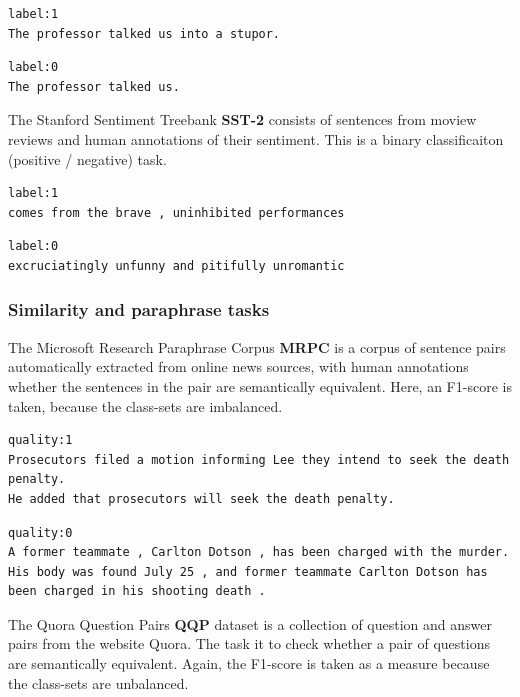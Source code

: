 \documentclass[a4paper,12pt,twoside,openright]{report}
\begin{document}
\begin{verbatim}
label:1
The professor talked us into a stupor.
\end{verbatim}

\begin{verbatim}
label:0	
The professor talked us.
\end{verbatim}


The Stanford Sentiment Treebank \textbf{SST-2} \cite{socher2013} consists of sentences from moview reviews and human annotations of their sentiment.
This is a binary classificaiton (positive / negative) task.


\begin{verbatim}
label:1
comes from the brave , uninhibited performances
\end{verbatim}

\begin{verbatim}
label:0
excruciatingly unfunny and pitifully unromantic
\end{verbatim}

\subsubsection{Similarity and paraphrase tasks}

The Microsoft Research Paraphrase Corpus \textbf{MRPC} \cite{dolan2005} is a corpus of sentence pairs automatically extracted from online news sources, with human annotations whether the sentences in the pair are semantically equivalent.
Here, an F1-score is taken, because the class-sets are imbalanced.


\begin{verbatim}
quality:1	
Prosecutors filed a motion informing Lee they intend to seek the death penalty.	
He added that prosecutors will seek the death penalty.
\end{verbatim}

\begin{verbatim}
quality:0	
A former teammate , Carlton Dotson , has been charged with the murder.	
His body was found July 25 , and former teammate Carlton Dotson has been charged in his shooting death .
\end{verbatim}

The Quora Question Pairs \textbf{QQP} \cite{shankar17} dataset is a collection of question and answer pairs from the website Quora. 
The task it to check whether a pair of questions are semantically equivalent.
Again, the F1-score is taken as a measure because the class-sets are unbalanced.
\end{document}
